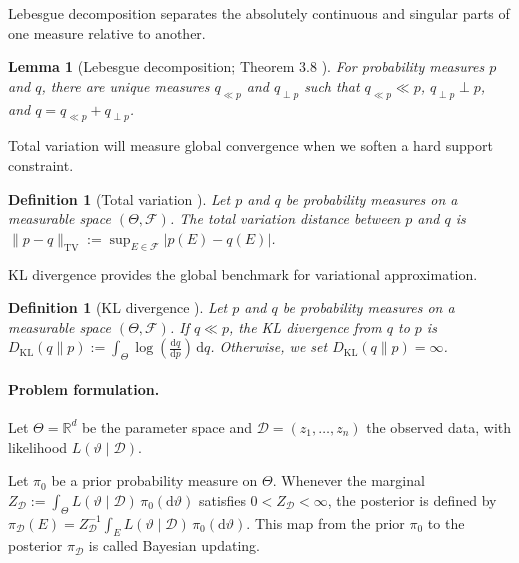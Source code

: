 \documentclass[11pt,a4paper]{article}
\theoremstyle{compactplain}
\newtheorem{lemma}[theorem]{Lemma}
\theoremstyle{compactdefinition}
\newtheorem{definition}[theorem]{Definition}
\numberwithin{equation}{section}
\begin{document}
Lebesgue decomposition separates the absolutely continuous and singular parts of one measure relative to another.

\begin{lemma}[Lebesgue decomposition; Theorem 3.8 \cite{folland1999real}] \label{lem:decom} For probability measures \(p\) and \(q\), there are unique measures \(q_{\ll p}\) and \(q_{\perp p}\) such that \(q_{\ll p}\ll p\), \(q_{\perp p}\perp p\), and \(q=q_{\ll p}+q_{\perp p}\). \end{lemma}

Total variation will measure global convergence when we soften a hard support constraint.

\begin{definition}[Total variation \cite{billingsley2013convergence}]
\label{def:tv}
Let \(p\) and \(q\) be probability measures on a measurable space
\((\Theta,\mathcal F)\). The total variation distance between \(p\) and \(q\) is
\(\|p-q\|_{\mathrm{TV}} := \sup_{E\in\mathcal F}|p(E)-q(E)|\).
\end{definition}

KL divergence provides the global benchmark for variational approximation.

\begin{definition}[KL divergence \cite{kullback1951information}]
\label{def:kl}
Let \(p\) and \(q\) be probability measures on a measurable space
\((\Theta,\mathcal F)\). If \(q\ll p\), the KL divergence from \(q\) to \(p\) is
\(D_{\mathrm{KL}}(q\|p) := \int_{\Theta} \log\!\left(\frac{\mathrm d q}{\mathrm d p}\right)\,\mathrm d q \).
Otherwise, we set \(D_{\mathrm{KL}}(q\|p)=\infty\).
\end{definition}


\paragraph{Problem formulation.}
Let \(\Theta=\mathbb R^d\) be the parameter space and \(\mathcal D=(z_1,\ldots,z_n)\) the observed data, with likelihood \(L(\vartheta\mid\mathcal D)\).

Let \(\pi_0\) be a prior probability measure on \(\Theta\). Whenever the marginal
\(
Z_{\mathcal D}
:=
\int_{\Theta} L(\vartheta\mid\mathcal D)\,\pi_0(\mathrm d\vartheta)
\) satisfies \(0<Z_{\mathcal D}<\infty\), the posterior is defined by
\(\pi_{\mathcal D}(E) =Z_{\mathcal D}^{-1} {\int_E L(\vartheta\mid\mathcal D)\,\pi_0(\mathrm d\vartheta)} \).
This map from the prior \(\pi_0\) to the posterior \(\pi_{\mathcal D}\) is called Bayesian updating.
\end{document}
